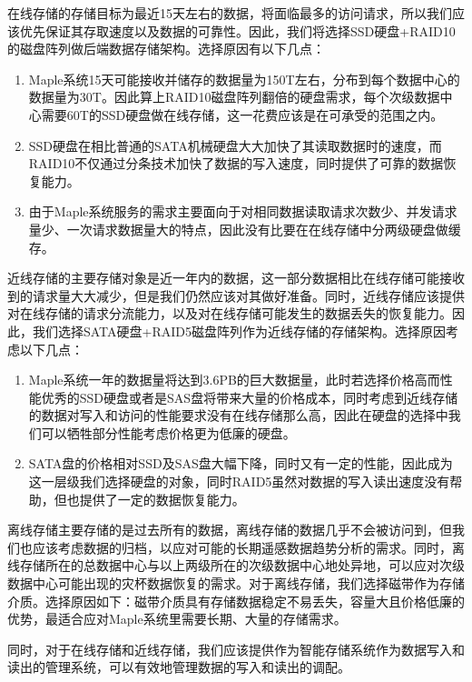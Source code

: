 \documentclass{article}
\begin{document}
在线存储的存储目标为最近15天左右的数据，将面临最多的访问请求，所以我们应该优先保证其存取速度以及数据的可靠性。因此，我们将选择SSD硬盘+RAID10的磁盘阵列做后端数据存储架构。选择原因有以下几点：
\begin{enumerate}
\item Maple系统15天可能接收并储存的数据量为150T左右，分布到每个数据中心的数据量为30T。因此算上RAID10磁盘阵列翻倍的硬盘需求，每个次级数据中心需要60T的SSD硬盘做在线存储，这一花费应该是在可承受的范围之内。

\item SSD硬盘在相比普通的SATA机械硬盘大大加快了其读取数据时的速度，而RAID10不仅通过分条技术加快了数据的写入速度，同时提供了可靠的数据恢复能力。

\item 由于Maple系统服务的需求主要面向于对相同数据读取请求次数少、并发请求量少、一次请求数据量大的特点，因此没有比要在在线存储中分两级硬盘做缓存。
\end{enumerate}

近线存储的主要存储对象是近一年内的数据，这一部分数据相比在线存储可能接收到的请求量大大减少，但是我们仍然应该对其做好准备。同时，近线存储应该提供对在线存储的请求分流能力，以及对在线存储可能发生的数据丢失的恢复能力。因此，我们选择SATA硬盘+RAID5磁盘阵列作为近线存储的存储架构。选择原因考虑以下几点：
\begin{enumerate}
\item Maple系统一年的数据量将达到3.6PB的巨大数据量，此时若选择价格高而性能优秀的SSD硬盘或者是SAS盘将带来大量的价格成本，同时考虑到近线存储的数据对写入和访问的性能要求没有在线存储那么高，因此在硬盘的选择中我们可以牺牲部分性能考虑价格更为低廉的硬盘。

\item SATA盘的价格相对SSD及SAS盘大幅下降，同时又有一定的性能，因此成为这一层级我们选择硬盘的对象，同时RAID5虽然对数据的写入读出速度没有帮助，但也提供了一定的数据恢复能力。
\end{enumerate}

离线存储主要存储的是过去所有的数据，离线存储的数据几乎不会被访问到，但我们也应该考虑数据的归档，以应对可能的长期遥感数据趋势分析的需求。同时，离线存储所在的总数据中心与以上两级所在的次级数据中心地处异地，可以应对次级数据中心可能出现的灾杯数据恢复的需求。对于离线存储，我们选择磁带作为存储介质。选择原因如下：磁带介质具有存储数据稳定不易丢失，容量大且价格低廉的优势，最适合应对Maple系统里需要长期、大量的存储需求。

同时，对于在线存储和近线存储，我们应该提供作为智能存储系统作为数据写入和读出的管理系统，可以有效地管理数据的写入和读出的调配。
\end{document}
